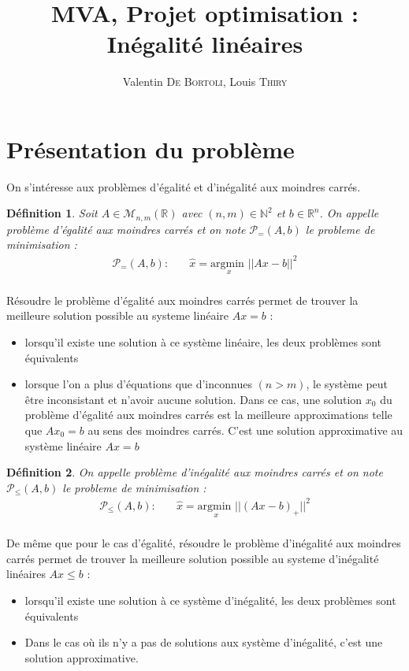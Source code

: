 \documentclass[10pt,a4paper]{article}
\title{MVA, Projet optimisation : Inégalité linéaires}
\author{Valentin \textsc{De Bortoli}, Louis \textsc{Thiry}}
\newtheorem{mydef}{Définition}
\begin{document}
\maketitle
\tableofcontents

\section{Présentation du problème}

On s'intéresse aux problèmes d'égalité et d'inégalité aux moindres carrés.

\begin{mydef}
  Soit $A \in \mathcal{M}_{n,m}(\mathbb{R})$ avec $(n,m) \in \mathbb{N}^2$ et $b \in \mathbb{R}^{n}$.
    On appelle problème d'égalité aux moindres carrés et on note $\mathcal{P}_{=} (A, b)$ le probleme de minimisation :
    \begin{align*}
      \mathcal{P}_{=}(A, b): \quad & \hat{x} = \underset{x}{\text{argmin }}  ||Ax - b||^{2}\\
    \end{align*}
\end{mydef}
Résoudre le problème d'égalité aux moindres carrés permet de trouver la meilleure solution possible au systeme linéaire $Ax = b$ :
\begin{itemize}
  \item lorsqu'il existe une solution à ce système linéaire, les deux problèmes sont équivalents
  \item lorsque l'on a plus d'équations que d'inconnues $(n > m)$, le système peut être inconsistant et n'avoir aucune solution.
    Dans ce cas, une solution $x_0$ du problème d'égalité aux moindres carrés est la meilleure approximations telle que $Ax_0 = b$ au sens des moindres carrés.
    C'est une solution approximative au système linéaire $Ax = b$
\end{itemize}

\begin{mydef}
  On appelle problème d'inégalité aux moindres carrés et on note $\mathcal{P}_{\leq} (A, b)$ le probleme de minimisation :
    \begin{align*}
      \mathcal{P}_{\leq} (A, b): \quad & \hat{x} = \underset{x}{\text{argmin }}  ||(Ax - b)_+||^{2}\\
    \end{align*}
\end{mydef}
De même que pour le cas d'égalité, résoudre le problème d'inégalité aux moindres carrés permet de trouver la meilleure solution possible au systeme d'inégalité linéaires $Ax \leq b$ :
\begin{itemize}
  \item lorsqu'il existe une solution à ce système d'inégalité, les deux problèmes sont équivalents
  \item Dans le cas où ils n'y a pas de solutions aux système d'inégalité, c'est une solution approximative.
\end{itemize}
\end{document}
